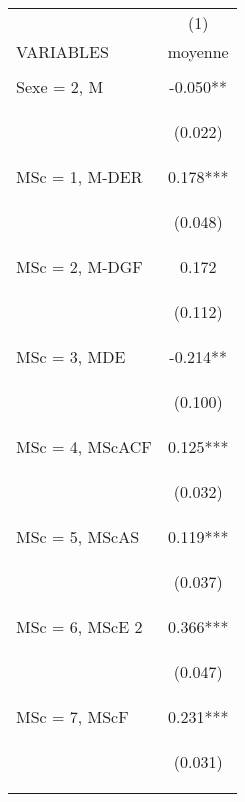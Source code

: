\begin{center}
\begin{tabular}{lc} \hline
 & (1) \\
VARIABLES & moyenne \\ \hline
\vspace{4pt} & \begin{footnotesize}\end{footnotesize} \\
Sexe = 2, M & -0.050** \\
\vspace{4pt} & \begin{footnotesize}(0.022)\end{footnotesize} \\
MSc = 1, M-DER & 0.178*** \\
\vspace{4pt} & \begin{footnotesize}(0.048)\end{footnotesize} \\
MSc = 2, M-DGF & 0.172 \\
\vspace{4pt} & \begin{footnotesize}(0.112)\end{footnotesize} \\
MSc = 3, MDE & -0.214** \\
\vspace{4pt} & \begin{footnotesize}(0.100)\end{footnotesize} \\
MSc = 4, MScACF & 0.125*** \\
\vspace{4pt} & \begin{footnotesize}(0.032)\end{footnotesize} \\
MSc = 5, MScAS & 0.119*** \\
\vspace{4pt} & \begin{footnotesize}(0.037)\end{footnotesize} \\
MSc = 6, MScE 2 & 0.366*** \\
\vspace{4pt} & \begin{footnotesize}(0.047)\end{footnotesize} \\
MSc = 7, MScF & 0.231*** \\
\vspace{4pt} & \begin{footnotesize}(0.031)\end{footnotesize} \\

\end{tabular}
\end{center}

